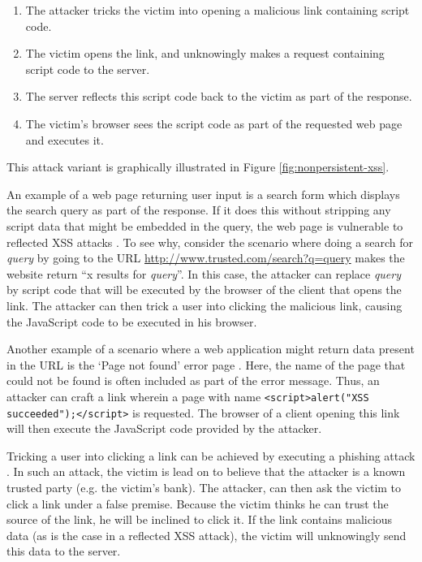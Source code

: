 \begin{enumerate}
	\item The attacker tricks the victim into opening a malicious link containing script code.
	\item The victim opens the link, and unknowingly makes a request containing script code to the server.
	\item The server reflects this script code back to the victim as part of the response.
	\item The victim's browser sees the script code as part of the requested web page and executes it.
\end{enumerate}

This attack variant is graphically illustrated in Figure \ref{fig:nonpersistent-xss}.

An example of a web page returning user input is a search form which displays the search query as part of the response. If it does this without stripping any script data that might be embedded in the query, the web page is vulnerable to reflected XSS attacks \cite{Vogt2007}. To see why, consider the scenario where doing a search for \emph{query} by going to the URL \url{http://www.trusted.com/search?q=query} makes the website return ``x results for \emph{query}''. In this case, the attacker can replace \emph{query} by script code that will be executed by the browser of the client that opens the link. The attacker can then trick a user into clicking the malicious link, causing the JavaScript code to be executed in his browser.

Another example of a scenario where a web application might return data present in the URL is the `Page not found' error page \cite{Kirda2006}. Here, the name of the page that could not be found is often included as part of the error message. Thus, an attacker can craft a link wherein a page with name \texttt{<script>alert("XSS succeeded");</script>} is requested. The browser of a client opening this link will then execute the JavaScript code provided by the attacker.

Tricking a user into clicking a link can be achieved by executing a \gls{phishing} attack \cite{Dhamija2006}. In such an attack, the victim is lead on to believe that the attacker is a known trusted party (e.g. the victim's bank). The attacker, can then ask the victim to click a link under a false premise. Because the victim thinks he can trust the source of the link, he will be inclined to click it. If the link contains malicious data (as is the case in a reflected XSS attack), the victim will unknowingly send this data to the server.

